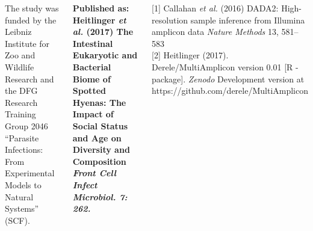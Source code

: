 \documentclass[30pt, a0paper, portrait, margin=0mm, innermargin=15mm,
               blockverticalspace=15mm, colspace=15mm, subcolspace=8mm]{tikzposter}
\begin{document}
\begin{columns}
{
  The study was funded by the Leibniz Institute for Zoo and
  Wildlife Research and the DFG Research Training Group 2046
  ``Parasite Infections: From Experimental Models to Natural
  Systems'' (SCF).

  \textbf{Published as:
  \hangindent=2cm  Heitlinger \textit{et al.} (2017) The
    Intestinal Eukaryotic and Bacterial Biome of Spotted Hyenas:
    The Impact of Social Status and Age on Diversity and
    Composition \textit{Front Cell Infect Microbiol. 7: 262.}}
}


      {
        \begin{small}
          
          \hangindent=2cm [1] Callahan \textit{et al.} (2016) DADA2:
          High-resolution sample inference from Illumina amplicon data
          \textit{Nature Methods} 13, 581--583\\

          \hangindent=2cm [2] Heitlinger (2017). Derele/MultiAmplicon
          version 0.01 [R - package]. \textit{Zenodo} Development
          version at https://github.com/derele/MultiAmplicon
          
        \end{small}
      }


\end{columns}

\end{document}
